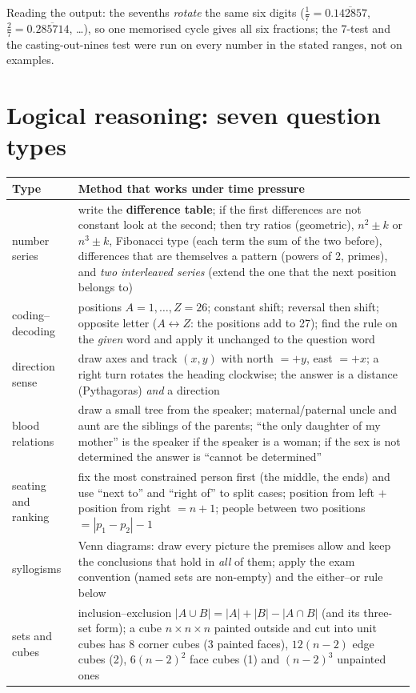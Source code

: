 \documentclass[10pt,a4paper,openany,oneside]{report}
\newcommand{\prio}[1]{\texorpdfstring{\ifcase#1\or{\color{gold}\ding{72}}\or{\color{gold}\ding{72}\ding{72}}\or{\color{gold}\ding{72}\ding{72}\ding{72}}\fi}{}}
\begin{document}
Reading the output: the sevenths \emph{rotate} the same six digits ($\frac17=0.\overline{142857}$, $\frac27=0.\overline{285714}$, \ldots), so one memorised cycle gives all six fractions; the 7-test and the casting-out-nines test were run on every number in the stated ranges, not on examples.


\section{Logical reasoning: seven question types \prio{2}}
\begin{center}\small
\begin{xltabular}{\textwidth}{@{}L{3.0cm}Y@{}}
\toprule
\textbf{Type} & \textbf{Method that works under time pressure}\\
\midrule\endhead
number series & write the \textbf{difference table}; if the first differences are not constant look at the second; then try ratios (geometric), $n^2\pm k$ or $n^3\pm k$, Fibonacci type (each term the sum of the two before), differences that are themselves a pattern (powers of 2, primes), and \emph{two interleaved series} (extend the one that the next position belongs to)\\
coding--decoding & positions $A=1,\dots,Z=26$; constant shift; reversal then shift; opposite letter ($A\leftrightarrow Z$: the positions add to 27); find the rule on the \emph{given} word and apply it unchanged to the question word\\
direction sense & draw axes and track $(x,y)$ with north $=+y$, east $=+x$; a right turn rotates the heading clockwise; the answer is a distance (Pythagoras) \emph{and} a direction\\
blood relations & draw a small tree from the speaker; maternal/paternal uncle and aunt are the siblings of the parents; ``the only daughter of my mother'' is the speaker if the speaker is a woman; if the sex is not determined the answer is ``cannot be determined''\\
seating and ranking & fix the most constrained person first (the middle, the ends) and use ``next to'' and ``right of'' to split cases; position from left $+$ position from right $=n+1$; people between two positions $=|p_1-p_2|-1$\\
syllogisms & Venn diagrams: draw every picture the premises allow and keep the conclusions that hold in \emph{all} of them; apply the exam convention (named sets are non-empty) and the either--or rule below\\
sets and cubes & inclusion--exclusion $|A\cup B|=|A|+|B|-|A\cap B|$ (and its three-set form); a cube $n\times n\times n$ painted outside and cut into unit cubes has 8 corner cubes (3 painted faces), $12(n-2)$ edge cubes (2), $6(n-2)^2$ face cubes (1) and $(n-2)^3$ unpainted ones\\
\bottomrule
\end{xltabular}
\end{center}
\end{document}
